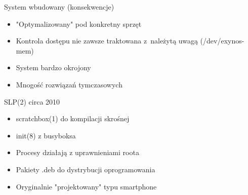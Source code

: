 \documentclass[presentation,aspectratio=43,12pt]{beamer}
\begin{document}
\begin{frame}[label=sec-2-5]{System wbudowany (konsekwencje)}
\begin{itemize}
\item "Optymalizowany" pod konkretny sprzęt

\item <2-> Kontrola dostępu nie zawsze traktowana z~należytą
uwagą (/dev/exynos-mem)

\item <3-> System bardzo okrojony

\item <4-> Mnogość rozwiązań tymczasowych
\end{itemize}

\end{frame}


\begin{frame}[label=sec-2-6]{SLP(2) circa 2010}
\begin{itemize}
\item scratchbox(1) do kompilacji skrośnej
\item init(8) z busyboksa
\item Procesy działają z uprawnieniami roota
\item Pakiety .deb do dystrybucji oprogramowania
\item <2-> Oryginalnie "projektowany" typu smartphone
\end{itemize}

\end{frame}
\end{document}
